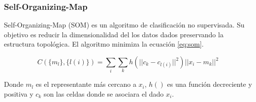 \subsubsection{Self-Organizing-Map}

Self-Organizing-Map (SOM) es un algoritmo de clasificación no supervisada. Su objetivo es reducir la dimensionalidad del los datos dados preservando la estructura topológica. El algoritmo minimiza la ecuación \ref{eq:som}.

\begin{equation}
    C(\{m_l\},\{l(i)\}) = \sum_i \sum_k h(||c_k-c_{l(i)}||^2) ||x_i-m_k||^2
    \label{eq:som}
\end{equation}

Donde $m_l$ es el representante más cercano a $x_i$, $h()$ es una función decreciente y positiva y $c_k$ son las celdas donde se asociara el dado $x_i$.